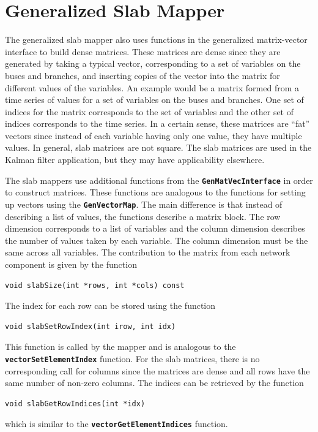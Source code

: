 \section{Generalized Slab Mapper}

The generalized slab mapper also uses functions in the generalized matrix-vector
interface to build dense matrices. These matrices are dense since they are
generated by taking a typical vector, corresponding to a set of variables on the
buses and branches, and inserting copies of the vector into the matrix for different values of the variables. An example would be a matrix formed from a time series of values for a set of variables on the buses and branches. One set of indices for the matrix corresponds to the set of variables and the other set of indices corresponds to the time series. In a certain sense, these matrices are ``fat'' vectors since instead of each variable having only one value, they have multiple values. In general, slab matrices are not square. The slab matrices are used in the Kalman filter application, but they may have applicability elsewhere.

The slab mappers use additional functions from the \texttt{\textbf{GenMatVecInterface}} in order to construct matrices. These functions are analogous to the functions for setting up vectors using the \texttt{\textbf{GenVectorMap}}. The main difference is that instead of describing a list of values, the functions describe a matrix block. The row dimension corresponds to a list of variables and the column dimension describes the number of values taken by each variable. The column dimension must be the same across all variables. The contribution to the matrix from each network component is given by the function

{
\color{red}
\begin{Verbatim}[fontseries=b]
void slabSize(int *rows, int *cols) const
\end{Verbatim}
}

The index for each row can be stored using the function

{
\color{red}
\begin{Verbatim}[fontseries=b]
void slabSetRowIndex(int irow, int idx)
\end{Verbatim}
}

This function is called by the mapper and is analogous to the \texttt{\textbf{vectorSetElementIndex}} function. For the slab matrices, there is no corresponding call for columns since the matrices are dense and all rows have the same number of non-zero columns. The indices can be retrieved by the function

{
\color{red}
\begin{Verbatim}[fontseries=b]
void slabGetRowIndices(int *idx)
\end{Verbatim}
}

which is similar to the \texttt{\textbf{vectorGetElementIndices}} function.
\newline
\hyperlink{topDoc}{\color{blue}{Top}}
